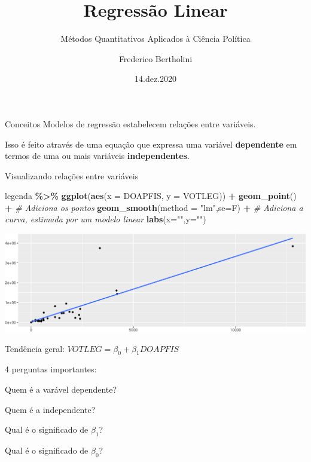\documentclass[
  9pt,
  ignorenonframetext,
  aspectratio=169]{beamer}
\title{Regressão Linear}
\subtitle{Métodos Quantitativos Aplicados à Ciência Política}
\author{Frederico Bertholini}
\date{14.dez.2020}
\newenvironment{Shaded}{\begin{snugshade}}{\end{snugshade}}
\newcommand{\CommentTok}[1]{\textcolor[rgb]{0.56,0.35,0.01}{\textit{#1}}}
\newcommand{\DataTypeTok}[1]{\textcolor[rgb]{0.13,0.29,0.53}{#1}}
\newcommand{\KeywordTok}[1]{\textcolor[rgb]{0.13,0.29,0.53}{\textbf{#1}}}
\newcommand{\NormalTok}[1]{#1}
\newcommand{\OperatorTok}[1]{\textcolor[rgb]{0.81,0.36,0.00}{\textbf{#1}}}
\newcommand{\StringTok}[1]{\textcolor[rgb]{0.31,0.60,0.02}{#1}}
\begin{document}
\frame{\titlepage}

\begin{frame}[allowframebreaks]
  \tableofcontents[hideallsubsections]
\end{frame}
\begin{frame}{Conceitos}
\protect\hypertarget{conceitos}{}
Modelos de regressão estabelecem relações entre variáveis.

Isso é feito através de uma equação que expressa uma variável
\textbf{dependente} em termos de uma ou mais variáveis
\textbf{independentes}.
\end{frame}

\begin{frame}[fragile]{Visualizando relações entre variáveis}
\protect\hypertarget{visualizando-relauxe7uxf5es-entre-variuxe1veis}{}
\begin{Shaded}
\begin{Highlighting}[]
\NormalTok{legenda }\OperatorTok{\%\textgreater{}\%}\StringTok{ }\KeywordTok{ggplot}\NormalTok{(}\KeywordTok{aes}\NormalTok{(}\DataTypeTok{x =}\NormalTok{ DOAPFIS, }\DataTypeTok{y =}\NormalTok{ VOTLEG)) }\OperatorTok{+}\StringTok{ }
\StringTok{  }\KeywordTok{geom\_point}\NormalTok{() }\OperatorTok{+}\StringTok{ }\CommentTok{\# Adiciona os pontos}
\StringTok{  }\KeywordTok{geom\_smooth}\NormalTok{(}\DataTypeTok{method =} \StringTok{"lm"}\NormalTok{,}\DataTypeTok{se=}\NormalTok{F) }\OperatorTok{+}\StringTok{ }\CommentTok{\# Adiciona a curva, estimada por um modelo linear}
\StringTok{  }\KeywordTok{labs}\NormalTok{(}\DataTypeTok{x=}\StringTok{""}\NormalTok{,}\DataTypeTok{y=}\StringTok{""}\NormalTok{)}
\end{Highlighting}
\end{Shaded}

\includegraphics{aula_12_files/figure-beamer/unnamed-chunk-1-1.pdf}
\end{frame}

\begin{frame}{}
\protect\hypertarget{section}{}
Tendência geral: \(VOTLEG = \beta_0 + \beta_1 DOAPFIS\)

4 perguntas importantes:

Quem é a varável dependente?

Quem é a independente?

Qual é o significado de \(\beta_1\)?

Qual é o significado de \(\beta_0\)?
\end{frame}
\end{document}
